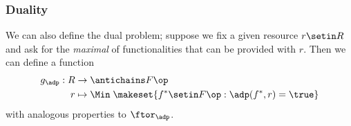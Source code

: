 %
%




\subsubsection{Duality}

We can also define the dual problem; suppose we fix a given resource $r \setin R$ and ask for the \emph{maximal   } of functionalities that can be provided with $r$.
Then we can define a function
\begin{equation}
    \begin{aligned}
        g_\adp : R & \to \antichains F\op \\
        r          & \mapsto \Min \; \makeset{ f^* \setin F\op : \adp(f^*, r) = \true }
    \end{aligned}
\end{equation}
with analogous properties to $\ftor_\adp$.

